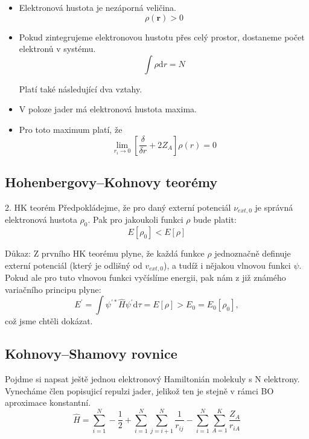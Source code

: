 \begin{itemize}
\item Elektronová hustota je nezáporná veličina.
\begin{equation}
\rho(\mathbf{r})  > 0
\end{equation}
\item Pokud zintegrujeme elektronovou hustotu přes celý prostor, dostaneme počet elektronů v systému.
\begin{equation}
\int \rho\mathrm{d}r = N
\end{equation}

Platí také následující dva vztahy.

\item V poloze jader má elektronová hustota maxima.
\item Pro toto maximum platí, že
\begin{equation}
\lim_{r_i \to 0} \left[ \frac{\delta}{\delta r}+2Z_A\right]\rho(r)=0
\end{equation}

\end{itemize}


\subsection{Hohenbergovy--Kohnovy teorémy}



2. HK teorém 
Předpokládejme, že pro daný externí potenciál $\nu_{ext,0}$ je správná elektronová hustota $\rho_0$. Pak pro jakoukoli funkci $\rho$ bude platit: $$ E[\rho_0] < E[\rho] $$

Důkaz:
Z prvního HK teorému plyne, že každá funkce $\rho$ jednoznačně definuje externí potenciál (který je odlišný od $v_{ext,0}$), a tudíž i nějakou vlnovou funkci $\psi$. Pokud ale pro tuto vlnovou funkci vyčíslíme energii, pak nám z již známého variačního principu plyne:
\begin{equation}
E^\prime=\int \psi^{\prime *} \hat{H} \psi^{\prime} \mathrm{d}\tau = E[\rho] > E_0 = E_0 [\rho_0] ,
\end{equation}
což jsme chtěli dokázat.

\subsection{Kohnovy--Shamovy rovnice}

Pojdme si napsat ještě jednou elektronový Hamiltonián molekuly s N elektrony. Vynecháme člen popisujicí repulzi jader, jelikož ten je stejně v rámci BO aproximace konstantní. 
\begin{equation}
\hat{H}=\sum_{i=1}^N -\frac{1}{2}+\sum_{i=1}^N\sum_{j=i+1}^N\frac{1}{r_{ij}}-\sum_{i=1}^N\sum_{A=1}^K \frac{Z_A}{r_{iA}}
\end{equation}

